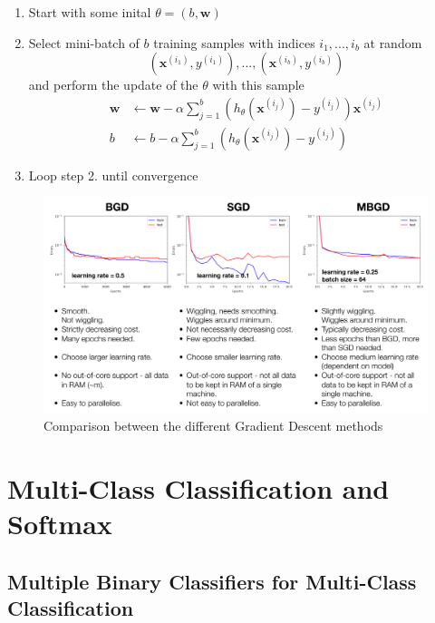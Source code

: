\documentclass[11pt]{article}
\begin{document}
\begin{enumerate}
	\item Start with some inital $\theta = (b,\textbf{w})$
	\item Select mini-batch of $b$ training samples with indices $i_1, ..., i_b$ at random\\
	\begin{equation*}
		 (\textbf{x}^{(i_1)}, y^{(i_1)}), ..., (\textbf{x}^{(i_b)}, y^{(i_b)})
	\end{equation*}
	and perform the update of the $\theta$ with this sample\\
	\begin{align*}
	\textbf{w} &\leftarrow \textbf{w} - \alpha \sum_{j=1}^{b} \left(h_\theta(\textbf{x}^{(i_j)}) - y^{(i_j)}\right) \textbf{x}^{(i_j)}\\
	b &\leftarrow b - \alpha \sum_{j=1}^{b} \left(h_\theta(\textbf{x}^{(i_j)}) - y^{(i_j)}\right)
	\end{align*}
	\item Loop step 2. until convergence
\end{enumerate}

\begin{figure}[tbh]
	\centering
	\includegraphics[width=0.8\linewidth, keepaspectratio]{img/comparison_gradient_descent}
	\caption{Comparison between the different Gradient Descent methods}
	\label{fig:comparisongradientdescent}
\end{figure}

\section{Multi-Class Classification and Softmax}

\subsection{Multiple Binary Classifiers for Multi-Class Classification}
\end{document}
